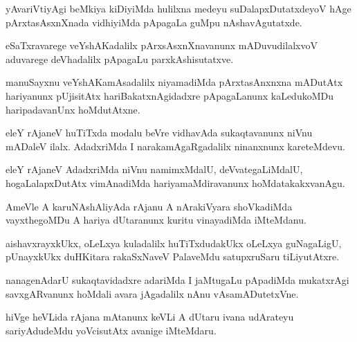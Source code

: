 \documentclass{article}
\begin{document}
\begin{mn}%
yAvariVtiyAgi beMkiya kiDiyiMda hulilxna medeyu suDalapxDutatxdeyoV hAge pArxtasAsxnXnada 
vidhiyiMda pApagaLa guMpu nAshavAgutatxde.
\end{mn}

\begin{mn}%
eSaTxravarege veYshAKadalilx pArxsAsxnXnavanunx mADuvudilalxvoV aduvarege deVhadalilx 
pApagaLu parxkAshisutatxve.
\end{mn}

\begin{mn}%
manuSayxnu veYshAKamAsadalilx niyamadiMda pArxtasAnxnxna  mADutAtx hariyanunx pUjisitAtx 
hariBakatxnAgidadxre pApagaLanunx kaLedukoMDu haripadavanUnx hoMdutAtxne.
\end{mn}

\begin{mn}%
eleY rAjaneV huTiTxda modalu beVre vidhavAda sukaqtavanunx niVnu mADaleV ilalx. AdadxriMda 
I narakamAgaRgadalilx ninanxnunx kareteMdevu.
\end{mn}

\begin{mn}%
eleY rAjaneV AdadxriMda niVnu namimxMdalU, deVvategaLiMdalU, hogaLalapxDutAtx vimAnadiMda 
hariyamaMdiravanunx hoMdatakakxvanAgu.
\end{mn}


\begin{mn}%
AmeVle A karuNAshAliyAda rAjanu A nArakiVyara shoVkadiMda vayxthegoMDu A hariya dUtaranunx 
kuritu vinayadiMda iMteMdanu.
\end{mn}

\begin{mn}%
aishavxrayxkUkx, oLeLxya kuladalilx huTiTxdudakUkx oLeLxya guNagaLigU, pUnayxkUkx 
duHKitara rakaSxNaveV PalaveMdu satupxruSaru tiLiyutAtxre.
\end{mn}

\begin{mn}%
nanagenAdarU sukaqtavidadxre adariMda I jaMtugaLu pApadiMda mukatxrAgi savxgARvanunx 
hoMdali avara jAgadalilx nAnu vAsamADutetxVne.
\end{mn}

\begin{mn}%
hiVge heVLida rAjana mAtanunx keVLi A dUtaru ivana udArateyu sariyAdudeMdu yoVcisutAtx 
avanige iMteMdaru.
\end{mn}
\end{document}
